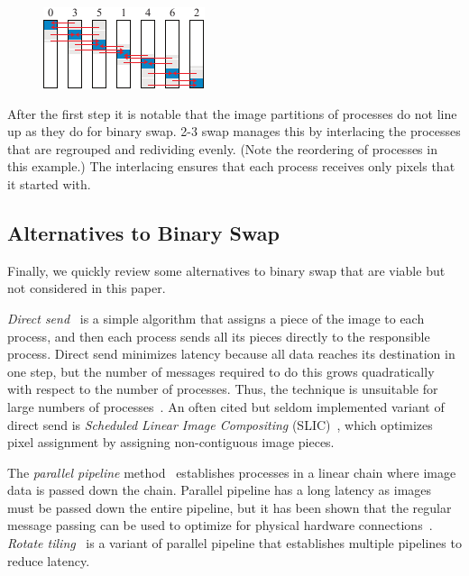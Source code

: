 \documentclass{vgtc}                          %
\newcommand*{\lcite}[1]{~\cite{#1}}
\newcommand*{\keyterm}[1]{\emph{#1}}
\newcommand{\textalgorithm}[1]{\textsf{#1}\xspace}
\newcommand{\Ttswap}{\textalgorithm{2-3 swap}}
\begin{document}
\begin{figure}
  \includegraphics[scale=.75]{2-3-swap-2}
\end{figure}
After the first step it is notable that the image partitions of processes do not line up as they do for binary swap.
\Ttswap manages this by interlacing the processes that are regrouped and redividing evenly.
(Note the reordering of processes in this example.)
The interlacing ensures that each process receives only pixels that it started with.

\subsection{Alternatives to Binary Swap}
\label{sec:BinarySwapAlternatives}

Finally, we quickly review some alternatives to binary swap that are viable but not considered in this paper.

\keyterm{Direct send}\lcite{DirectSend1} is a simple algorithm that assigns a piece of the image to each process, and then each process sends all its pieces directly to the responsible process.
Direct send minimizes latency because all data reaches its destination in one step, but the number of messages required to do this grows quadratically with respect to the number of processes.
Thus, the technique is unsuitable for large numbers of processes\lcite{Moreland2011:SC}.
An often cited but seldom implemented variant of direct send is \keyterm{Scheduled Linear Image Compositing} (SLIC)\lcite{SLIC}, which optimizes pixel assignment by assigning non-contiguous image pieces.

The \keyterm{parallel pipeline} method\lcite{Lee1996} establishes processes in a linear chain where image data is passed down the chain.
Parallel pipeline has a long latency as images must be passed down the entire pipeline, but it has been shown that the regular message passing can be used to optimize for physical hardware connections\lcite{Wu2009}.
\keyterm{Rotate tiling}\lcite{Lin2004} is a variant of parallel pipeline that establishes multiple pipelines to reduce latency.
\end{document}
